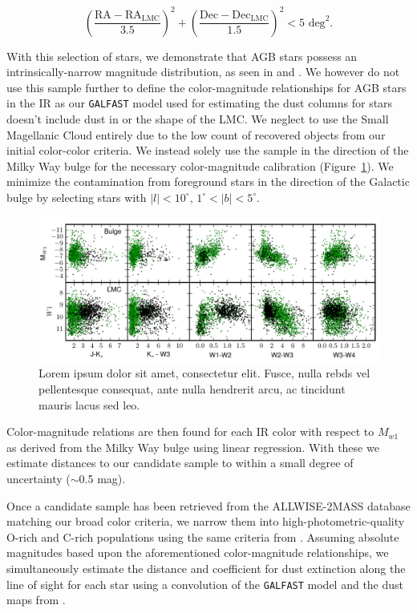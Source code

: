 $$\displaystyle\left(\frac{\text{RA} - \text{RA}_\text{LMC}}{3.5}\right)^2 + \left(\frac{\text{Dec} - \text{Dec}_\text{LMC}}{1.5} \right)^2 < 5 \text{ deg}^2.$$

\noindent With this selection of stars, we demonstrate that AGB stars possess an intrinsically-narrow magnitude distribution, as seen in \cite{1985A&A...152L...1H} and \cite{2002MNRAS.337..749J}. We however do not use this sample further to define the color-magnitude relationships for AGB stars in the IR as our {\tt GALFAST} model used for estimating the dust columns for stars doesn't include dust in or the shape of the LMC. We neglect to use the Small Magellanic Cloud entirely due to the low count of recovered objects from our initial color-color criteria.  We instead solely use the sample in the direction of the Milky Way bulge for the necessary color-magnitude calibration (Figure~\ref{fig:colormag}). We minimize the contamination from foreground stars in the direction of the Galactic bulge by selecting stars with $\lvert l\rvert < 10^\circ$, $1^\circ < \lvert b \rvert < 5^\circ$. 

\begin{figure}[h]
\includegraphics[width=6in]{figs/bulge_lmc_colormag.pdf}
\caption{Lorem ipsum dolor sit amet, consectetur elit. Fusce, nulla rebds vel pellentesque consequat, ante nulla hendrerit arcu, ac tincidunt mauris lacus sed leo.}
\label{fig:colormag}
\end{figure}

Color-magnitude relations are then found for each IR color with respect to $M_{w1}$ as derived from the Milky Way bulge using linear regression. With these we estimate distances to our candidate sample to within a small degree of uncertainty ($\sim$0.5 mag).

Once a candidate sample has been retrieved from the ALLWISE-2MASS database matching our broad color criteria, we narrow them into high-photometric-quality O-rich and C-rich populations using the same criteria from \cite{2014MNRAS.442.3361N}. Assuming absolute magnitudes based upon the aforementioned color-magnitude relationships, we simultaneously estimate the distance and coefficient for dust extinction along the line of sight for each star using a convolution of the {\tt GALFAST} model and the dust maps from \cite{1998ApJ...500..525S}.

